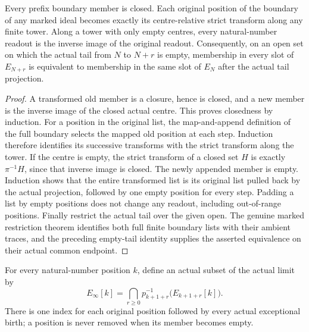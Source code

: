 \begin{lemma}
\label{hir:actual-lf-boundary-finite-calculus}
\leanok
Every prefix boundary member is closed.  Each original position of the boundary
of any marked ideal becomes exactly its centre-relative strict transform along
any finite tower.  Along a tower with only empty centres, every natural-number
readout is the inverse image of the original readout.  Consequently, on an open
set on which the actual tail from $N$ to $N+r$ is empty, membership in every slot
of $E_{N+r}$ is equivalent to membership in the same slot of $E_N$ after the
actual tail projection.
\end{lemma}
\begin{proof}
A transformed old member is a closure, hence is closed, and a new member is the
inverse image of the closed actual centre.  This proves closedness by induction.
For a position in the original list, the map-and-append definition of the full
boundary selects the mapped old position at each step.  Induction therefore
identifies its successive transforms with the strict transform along the tower.
If the centre is empty, the strict transform of a closed set $H$ is exactly
$\pi^{-1}H$, since that inverse image is closed.  The newly appended member is
empty.  Induction shows that the entire transformed list is its original list
pulled back by the actual projection, followed by one empty position for every
step.  Padding a list by empty positions does not change any readout, including
out-of-range positions.  Finally restrict the actual tail over the given open.
The genuine marked restriction theorem identifies both full finite boundary
lists with their ambient traces, and the preceding empty-tail identity supplies
the asserted equivalence on their actual common endpoint.
\end{proof}

\begin{definition}
\label{hir:actual-lf-boundary-definition}
\leanok
For every natural-number position $k$, define an actual subset of the actual limit by
\[
 E_\infty[k]=\bigcap_{r\geq0}p_{k+1+r}^{-1}\bigl(E_{k+1+r}[k]\bigr).
\]
There is one index for each original position followed by every actual exceptional
birth; a position is never removed when its member becomes empty.
\end{definition}

